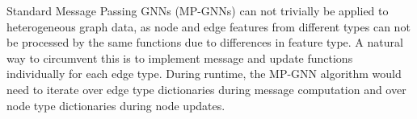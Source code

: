 \documentclass{report} %
\begin{document}
Standard Message Passing GNNs (MP-GNNs) can not trivially be applied to heterogeneous graph data, as node and edge features from different types can not be processed by the same functions due to differences in feature type. 
A natural way to circumvent this is to implement message and update functions individually for each edge type. 
During runtime, the MP-GNN algorithm would need to iterate over edge type dictionaries during message computation and over node type dictionaries during node updates.







\end{document}
